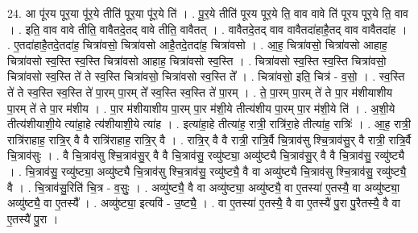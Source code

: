 \documentclass[17pt]{extarticle}
\begin{document}
24. आ पू॑रय पूर॒या पू॑र॒ये तीति॑ पूर॒या पू॑र॒ये ति॑ । . पू॒र॒ये तीति॑ पूरय पूर॒ये ति॒ वाव वावे ति॑ पूरय पूर॒ये ति॒ वाव । . इति॒ वाव वावे तीति॒ वावैतदे॒तद् वावे तीति॒ वावैतत् । . वावैतदे॒तद् वाव वावैतदा॑हाहै॒तद् वाव वावैतदा॑ह । . ए॒तदा॑हाहै॒तदे॒तदा॑ह॒ चित्रा॑वसो॒ चित्रा॑वसो आहै॒तदे॒तदा॑ह॒ चित्रा॑वसो । . आ॒ह॒ चित्रा॑वसो॒ चित्रा॑वसो आहाह॒ चित्रा॑वसो स्व॒स्ति स्व॒स्ति चित्रा॑वसो आहाह॒ चित्रा॑वसो स्व॒स्ति । . चित्रा॑वसो स्व॒स्ति स्व॒स्ति चित्रा॑वसो॒ चित्रा॑वसो स्व॒स्ति ते॑ ते स्व॒स्ति चित्रा॑वसो॒ चित्रा॑वसो स्व॒स्ति ते᳚ । . चित्रा॑वसो॒ इति॒ चित्र॑ - व॒सो॒ । . स्व॒स्ति ते॑ ते स्व॒स्ति स्व॒स्ति ते॑ पा॒रम् पा॒रम् ते᳚ स्व॒स्ति स्व॒स्ति ते॑ पा॒रम् । . ते॒ पा॒रम् पा॒रम् ते॑ ते पा॒र म॑शीयाशीय पा॒रम् ते॑ ते पा॒र म॑शीय । . पा॒र म॑शीयाशीय पा॒रम् पा॒र म॑शी॒ये तीत्य॑शीय पा॒रम् पा॒र म॑शी॒ये ति॑ । . अ॒शी॒ये तीत्य॑शीयाशी॒ये त्या॑हा॒हे त्य॑शीयाशी॒ये त्या॑ह । . इत्या॑हा॒हे तीत्या॑ह॒ रात्री॒ रात्रि॑रा॒हे तीत्या॑ह॒ रात्रिः॑ । . आ॒ह॒ रात्री॒ रात्रि॑राहाह॒ रात्रि॒र् वै वै रात्रि॑राहाह॒ रात्रि॒र् वै । . रात्रि॒र् वै वै रात्री॒ रात्रि॒र्वै चि॒त्राव॑सु श्चि॒त्राव॑सु॒र् वै रात्री॒ रात्रि॒र्वै चि॒त्राव॑सुः । . वै चि॒त्राव॑सु श्चि॒त्राव॑सु॒र् वै वै चि॒त्राव॑सु॒ रव्यु॑ष्ट्या॒ अव्यु॑ष्ट्यै चि॒त्राव॑सु॒र् वै वै चि॒त्राव॑सु॒ रव्यु॑ष्ट्यै । . चि॒त्राव॑सु॒ रव्यु॑ष्ट्या॒ अव्यु॑ष्ट्यै चि॒त्राव॑सु श्चि॒त्राव॑सु॒ रव्यु॑ष्ट्यै॒ वै वा अव्यु॑ष्ट्यै चि॒त्राव॑सु श्चि॒त्राव॑सु॒ रव्यु॑ष्ट्यै॒ वै । . चि॒त्राव॑सु॒रिति॑ चि॒त्र - व॒सुः॒ । . अव्यु॑ष्ट्यै॒ वै वा अव्यु॑ष्ट्या॒ अव्यु॑ष्ट्यै॒ वा ए॒तस्या॑ ए॒तस्यै॒ वा अव्यु॑ष्ट्या॒ अव्यु॑ष्ट्यै॒ वा ए॒तस्यै᳚ । . अव्यु॑ष्ट्या॒ इत्यवि॑ - उ॒ष्ट्यै॒ । . वा ए॒तस्या॑ ए॒तस्यै॒ वै वा ए॒तस्यै॑ पु॒रा पु॒रैतस्यै॒ वै वा ए॒तस्यै॑ पु॒रा । \newline
\end{document}
